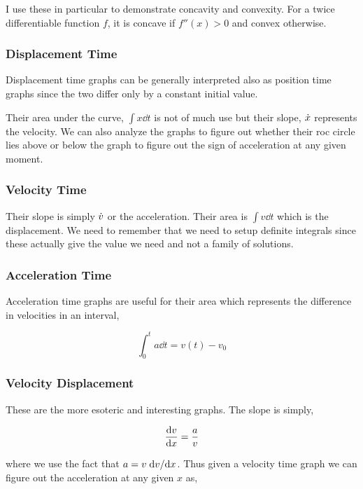 I use these in particular to demonstrate concavity and convexity. 
For a twice differentiable function \(f\), it is concave if \(f''(x) > 0\) and convex 
otherwise. 

\subsubsection{Displacement Time}

Displacement time graphs can be generally interpreted also as position 
time graphs since the two differ only by a constant initial value.

Their area under the curve, \(\int x \dd{t}\) is not of much use but their 
slope, \(\dot{x}\) represents the velocity. We can also analyze the graphs 
to figure out whether their roc circle lies above or below the graph to figure out 
the sign of acceleration at any given moment.

\subsubsection{Velocity Time}

Their slope is simply \(\dot{v}\) or the acceleration. Their area is 
\(\int v \dd{t}\) which is the displacement. We need to remember that 
we need to setup definite integrals since these actually give the value 
we need and not a family of solutions. 

\subsubsection{Acceleration Time}

Acceleration time graphs are useful for their area which represents the difference 
in velocities in an interval,

\begin{equation*}
    \int_{0}^{t} a \dd{t} = v(t) - v_0
\end{equation*}

\subsubsection{Velocity Displacement}

These are the more esoteric and interesting graphs. The slope is simply,

\begin{equation*}
    \dv{v}{x} = \frac{a}{v}
\end{equation*}

where we use the fact that \(a = v \dv*{v}{x}\). Thus given a velocity time 
graph we can figure out the acceleration at any given \(x\) as, 

